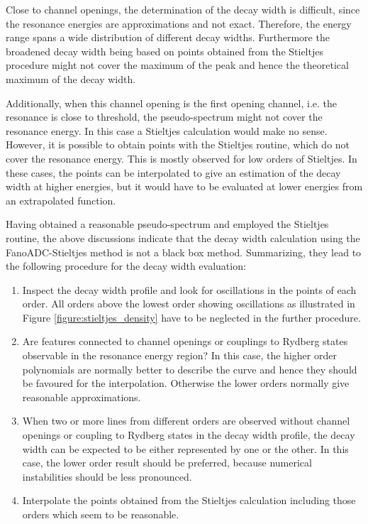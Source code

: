 Close to channel openings, the determination of the decay width is difficult, since
the resonance energies are approximations and not exact. Therefore, the
energy range spans a wide distribution of different decay widths. Furthermore
the broadened decay width being based on points obtained from the Stieltjes
procedure might not cover the maximum of the peak and hence the theoretical
maximum of the decay width.

Additionally, when this channel opening is the first opening channel, i.e. the
resonance is close to threshold, the pseudo-spectrum might not cover the resonance energy.
In this case a Stieltjes calculation would make no sense. However, it is possible
to obtain points with the Stieltjes routine, which do not cover the resonance
energy.
This is mostly observed for low orders of Stieltjes. In these cases, the points
can be interpolated to give an estimation of the decay width at higher energies,
but it would have to be evaluated at lower energies from an extrapolated function.

Having obtained a reasonable pseudo-spectrum and employed the Stieltjes routine,
the above discussions indicate that the decay width calculation
 using the FanoADC-Stieltjes
method is not a black box method. Summarizing, they lead to the
following procedure for the decay width evaluation:
\begin{enumerate}
 \item Inspect the decay width profile and look for oscillations in the
       points of each order. All orders above the lowest order showing oscillations as
       illustrated in Figure \ref{figure:stieltjes_density}
       have to be neglected in the further
       procedure.
 \item Are features connected to channel openings or couplings to Rydberg states
       observable in the resonance energy region? In this case, the higher
       order polynomials are normally better to describe the curve and hence they
       should be favoured for the interpolation. Otherwise the lower orders
       normally give reasonable approximations.
 \item When two or more lines from different orders are observed without channel
       openings or coupling to Rydberg states in the decay width profile,
       the decay width can be expected to be either represented by one or the
       other. In this case, the lower order result should be preferred, because
       numerical instabilities should be less pronounced.
 \item Interpolate the points obtained from the Stieltjes calculation including
       those orders which seem to be
       reasonable.
\end{enumerate}
